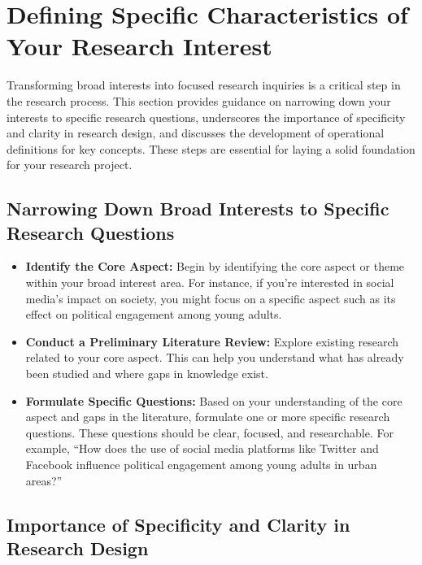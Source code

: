 \documentclass[
]{book}
\begin{document}
\hypertarget{defining-specific-characteristics-of-your-research-interest}{%
\section{Defining Specific Characteristics of Your Research Interest}\label{defining-specific-characteristics-of-your-research-interest}}

Transforming broad interests into focused research inquiries is a critical step in the research process. This section provides guidance on narrowing down your interests to specific research questions, underscores the importance of specificity and clarity in research design, and discusses the development of operational definitions for key concepts. These steps are essential for laying a solid foundation for your research project.

\hypertarget{narrowing-down-broad-interests-to-specific-research-questions}{%
\subsection*{Narrowing Down Broad Interests to Specific Research Questions}\label{narrowing-down-broad-interests-to-specific-research-questions}}

\begin{itemize}
\item
  \textbf{Identify the Core Aspect:} Begin by identifying the core aspect or theme within your broad interest area. For instance, if you're interested in social media's impact on society, you might focus on a specific aspect such as its effect on political engagement among young adults.
\item
  \textbf{Conduct a Preliminary Literature Review:} Explore existing research related to your core aspect. This can help you understand what has already been studied and where gaps in knowledge exist.
\item
  \textbf{Formulate Specific Questions:} Based on your understanding of the core aspect and gaps in the literature, formulate one or more specific research questions. These questions should be clear, focused, and researchable. For example, ``How does the use of social media platforms like Twitter and Facebook influence political engagement among young adults in urban areas?''
\end{itemize}

\hypertarget{importance-of-specificity-and-clarity-in-research-design}{%
\subsection*{Importance of Specificity and Clarity in Research Design}\label{importance-of-specificity-and-clarity-in-research-design}}
\end{document}
